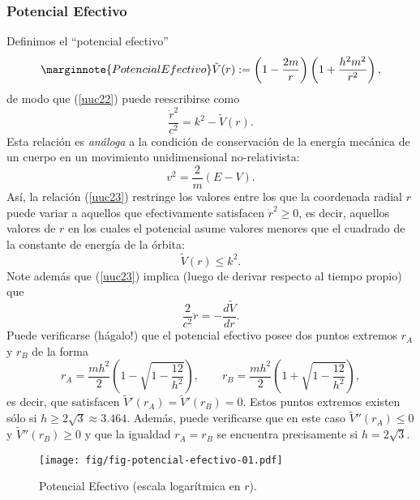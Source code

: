 \subsubsection{Potencial Efectivo}
Definimos el ``potencial efectivo''
\begin{equation}\marginnote{Potencial Efectivo}
 \tilde{V}(r):=\left(1-\frac{2m}{r}\right)\left(1+\frac{h^2m^2}{r^2}
\right),
\end{equation}
de modo que (\ref{uuc22}) puede reescribirse como
\begin{equation}
 \frac{\dot{r}^2}{c^2}=k^2-\tilde{V}(r).
\label{uuc23}
\end{equation}
Esta relación es \textit{análoga} a la condición de conservación de la energía mecánica de un cuerpo en un movimiento unidimensional no-relativista:
\begin{equation}
 v^2=\frac{2}{m}(E-V).
\end{equation}
Así, la relación (\ref{uuc23}) restringe los valores entre los que la coordenada radial $r$ puede variar a aquellos que efectivamente satisfacen $\dot{r}^2\ge 0$, es decir, aquellos valores de $r$ en los cuales el potencial asume valores menores que el cuadrado de la constante de energía de la órbita:
\begin{equation}
 \tilde{V}(r)\le k^2.
\end{equation}
Note además que (\ref{uuc23}) implica (luego de derivar respecto al tiempo propio) que
\begin{equation}\label{ddotr}
\frac{2}{c^2}\ddot{r}=-\frac{d\tilde{V}}{dr}.
\end{equation}
Puede verificarse (hágalo!) que el potencial efectivo posee dos puntos extremos $r_A$ y $r_B$ de la forma
\begin{equation}
 r_A=\frac{mh^2}{2}\left(1-\sqrt{1-\frac{12}{h^2}}\right), \qquad r_B=\frac{mh^2}{2}\left(1+\sqrt{1-\frac{12}{h^2}}\right), \label{rAB}
\end{equation}
es decir, que satisfacen $\tilde{V}'(r_A)=\tilde{V}'(r_B)=0$. Estos puntos extremos existen sólo si $h\ge2\sqrt{3}\approx 3.464$. Además, puede verificarse que en este caso $\tilde{V}''(r_A)\le 0$ y $\tilde{V}''(r_B)\ge 0$ y que la igualdad $r_A=r_B$ se encuentra precisamente si $h=2\sqrt{3}$.
\begin{figure}[H]
\begin{center}
\texttt{[image: fig/fig-potencial-efectivo-01.pdf]}
\caption{Potencial Efectivo (escala logarítmica en $r$).} \label{fpe}
\end{center}
\end{figure}

